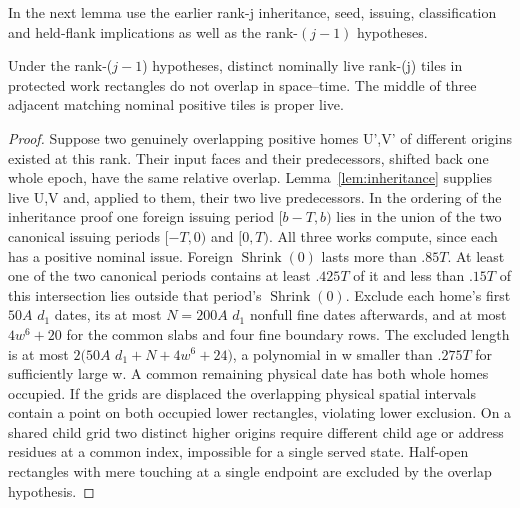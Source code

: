 In the next lemma use the earlier rank-j inheritance, seed, issuing, classification and held-flank implications as well as the rank-\((j-1)\) hypotheses.
\begin{lemma}\label{lem:exclusion}
Under the rank-(\(j-1\)) hypotheses, distinct nominally live rank-(j) tiles in protected work rectangles do not overlap in space--time. The middle of three adjacent matching nominal positive tiles is proper live.
\end{lemma}
\begin{proof}
Suppose two genuinely overlapping positive homes U',V' of different origins existed at this rank. Their input faces and their predecessors, shifted back one whole epoch, have the same relative overlap. Lemma~\ref{lem:inheritance} supplies live U,V and, applied to them, their two live predecessors. In the ordering of the inheritance proof one foreign issuing period \([b- T,b)\) lies in the union of the two canonical issuing periods \([- T,0)\) and \([0,T)\). All three works compute, since each has a positive nominal issue. Foreign \(\operatorname{Shrink}(0)\) lasts more than \(.85T\). At least one of the two canonical periods contains at least \(.425T\) of it and less than \(.15T\) of this intersection lies outside that period's \(\operatorname{Shrink}(0)\). Exclude each home's first \(50A\) \(d_1\) dates, its at most \(N=200A\) \(d_1\) nonfull fine dates afterwards, and at most \(4w^6+20\) for the common slabs and four fine boundary rows. The excluded length is at most \(2(50A\) \(d_1+N+4w^6+24)\), a polynomial in w smaller than \(.275T\) for sufficiently large w. A common remaining physical date has both whole homes occupied. If the grids are displaced the overlapping physical spatial intervals contain a point on both occupied lower rectangles, violating lower exclusion. On a shared child grid two distinct higher origins require different child age or address residues at a common index, impossible for a single served state. Half-open rectangles with mere touching at a single endpoint are excluded by the overlap hypothesis.


\end{proof}
